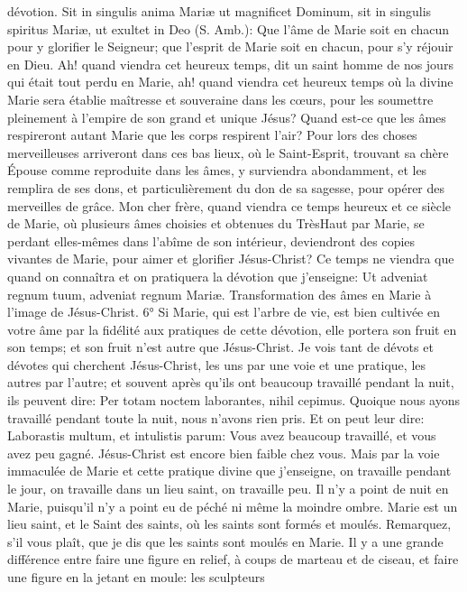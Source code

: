 dévotion. Sit in singulis anima Mariæ ut magnificet Dominum, sit in singulis spiritus Mariæ, ut exultet in Deo (S.
Amb.): Que l'âme de Marie soit en chacun pour y glorifier le Seigneur; que l'esprit de Marie soit en chacun, pour s'y
réjouir en Dieu. Ah! quand viendra cet heureux temps, dit un saint homme de nos jours qui était tout perdu en
Marie, ah! quand viendra cet heureux temps où la divine Marie sera établie maîtresse et souveraine dans les
cœurs, pour les soumettre pleinement à l'empire de son grand et unique Jésus? Quand est-ce que les âmes
respireront autant Marie que les corps respirent l'air? Pour lors des choses merveilleuses arriveront dans ces bas
lieux, où le Saint-Esprit, trouvant sa chère Épouse comme reproduite dans les âmes, y surviendra abondamment,
et les remplira de ses dons, et particulièrement du don de sa sagesse, pour opérer des merveilles de grâce. Mon
cher frère, quand viendra ce temps heureux et ce siècle de Marie, où plusieurs âmes choisies et obtenues du TrèsHaut par Marie, se perdant elles-mêmes dans l'abîme de son intérieur, deviendront des copies vivantes de Marie,
pour aimer et glorifier Jésus-Christ? Ce temps ne viendra que quand on connaîtra et on pratiquera la dévotion que
j'enseigne: Ut adveniat regnum tuum, adveniat regnum Mariæ.
Transformation des âmes en Marie à l'image de Jésus-Christ.
 6° Si Marie, qui est l'arbre de vie, est bien cultivée en votre âme par la fidélité aux pratiques de cette
dévotion, elle portera son fruit en son temps; et son fruit n'est autre que Jésus-Christ. Je vois tant de dévots et
dévotes qui cherchent Jésus-Christ, les uns par une voie et une pratique, les autres par l'autre; et souvent après
qu'ils ont beaucoup travaillé pendant la nuit, ils peuvent dire: Per totam noctem laborantes, nihil cepimus. Quoique
nous ayons travaillé pendant toute la nuit, nous n'avons rien pris. Et on peut leur dire: Laborastis multum, et
intulistis parum: Vous avez beaucoup travaillé, et vous avez peu gagné. Jésus-Christ est encore bien faible chez
vous. Mais par la voie immaculée de Marie et cette pratique divine que j'enseigne, on travaille pendant le jour, on
travaille dans un lieu saint, on travaille peu. Il n'y a point de nuit en Marie, puisqu'il n'y a point eu de péché ni
même la moindre ombre. Marie est un lieu saint, et le Saint des saints, où les saints sont formés et moulés.
 Remarquez, s'il vous plaît, que je dis que les saints sont moulés en Marie. Il y a une grande différence entre
faire une figure en relief, à coups de marteau et de ciseau, et faire une figure en la jetant en moule: les sculpteurs
